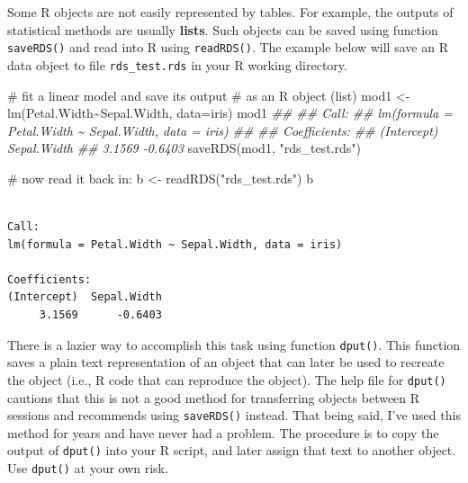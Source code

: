 \documentclass[
  13,
  letterpaper,
]{report}
\newenvironment{Shaded}{\begin{snugshade}}{\end{snugshade}}
\newcommand{\AttributeTok}[1]{\textcolor[rgb]{0.40,0.45,0.13}{#1}}
\newcommand{\CommentTok}[1]{\textcolor[rgb]{0.37,0.37,0.37}{#1}}
\newcommand{\DocumentationTok}[1]{\textcolor[rgb]{0.37,0.37,0.37}{\textit{#1}}}
\newcommand{\FunctionTok}[1]{\textcolor[rgb]{0.28,0.35,0.67}{#1}}
\newcommand{\NormalTok}[1]{\textcolor[rgb]{0.00,0.23,0.31}{#1}}
\newcommand{\OtherTok}[1]{\textcolor[rgb]{0.00,0.23,0.31}{#1}}
\newcommand{\SpecialCharTok}[1]{\textcolor[rgb]{0.37,0.37,0.37}{#1}}
\newcommand{\StringTok}[1]{\textcolor[rgb]{0.13,0.47,0.30}{#1}}
\begin{document}
Some R objects are not easily represented by tables. For example, the
outputs of statistical methods are usually \textbf{lists}. Such objects
can be saved using function \texttt{saveRDS()} and read into R using
\texttt{readRDS()}. The example below will save an R data object to file
\texttt{rds\_test.rds} in your R working directory.

\begin{Shaded}
\begin{Highlighting}[]
\CommentTok{\# fit a linear model and save its output}
\CommentTok{\# as an R object (list)}
\NormalTok{mod1 }\OtherTok{\textless{}{-}} \FunctionTok{lm}\NormalTok{(Petal.Width}\SpecialCharTok{\textasciitilde{}}\NormalTok{Sepal.Width, }\AttributeTok{data=}\NormalTok{iris)}
\NormalTok{mod1}
\DocumentationTok{\#\# }
\DocumentationTok{\#\# Call:}
\DocumentationTok{\#\# lm(formula = Petal.Width \textasciitilde{} Sepal.Width, data = iris)}
\DocumentationTok{\#\# }
\DocumentationTok{\#\# Coefficients:}
\DocumentationTok{\#\# (Intercept)  Sepal.Width  }
\DocumentationTok{\#\#      3.1569      {-}0.6403}
\FunctionTok{saveRDS}\NormalTok{(mod1, }\StringTok{"rds\_test.rds"}\NormalTok{)}
\end{Highlighting}
\end{Shaded}

\begin{Shaded}
\begin{Highlighting}[]
\CommentTok{\# now read it back in:}
\NormalTok{b }\OtherTok{\textless{}{-}} \FunctionTok{readRDS}\NormalTok{(}\StringTok{"rds\_test.rds"}\NormalTok{)}
\NormalTok{b}
\end{Highlighting}
\end{Shaded}

\begin{verbatim}

Call:
lm(formula = Petal.Width ~ Sepal.Width, data = iris)

Coefficients:
(Intercept)  Sepal.Width  
     3.1569      -0.6403  
\end{verbatim}

There is a lazier way to accomplish this task using function
\texttt{dput()}. This function saves a plain text representation of an
object that can later be used to recreate the object (i.e., R code that
can reproduce the object). The help file for \texttt{dput()} cautions
that this is not a good method for transferring objects between R
sessions and recommends using \texttt{saveRDS()} instead. That being
said, I've used this method for years and have never had a problem. The
procedure is to copy the output of \texttt{dput()} into your R script,
and later assign that text to another object. Use \texttt{dput()} at
your own risk.
\end{document}
